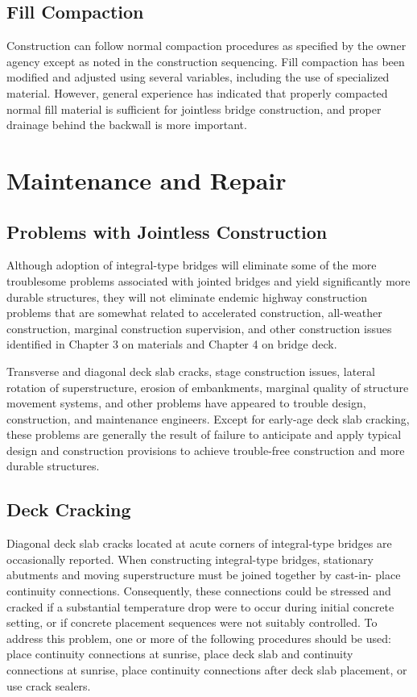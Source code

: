\subsection{Fill Compaction}
Construction can follow normal compaction procedures as specified by the owner agency except as noted in the
construction sequencing. Fill compaction has been modified and adjusted using several variables, including the use of
specialized material. However, general experience has indicated that properly compacted normal fill material is
sufficient for jointless bridge construction, and proper drainage behind the backwall is more important.



\section{Maintenance and Repair}
\subsection{Problems with Jointless Construction}
Although adoption of integral-type bridges will eliminate some of the more troublesome problems associated with
jointed bridges and yield significantly more durable structures, they will not eliminate endemic highway construction
problems that are somewhat related to accelerated construction, all-weather construction, marginal construction
supervision, and other construction issues identified in Chapter 3 on materials and Chapter 4 on bridge deck.

Transverse and diagonal deck slab cracks, stage construction issues, lateral rotation of superstructure, erosion of
embankments, marginal quality of structure movement systems, and other problems have appeared to trouble design,
construction, and maintenance engineers. Except for early-age deck slab cracking, these problems are generally the
result of failure to anticipate and apply typical design and construction provisions to achieve trouble-free construction
and more durable structures.

\subsection{Deck Cracking}
Diagonal deck slab cracks located at acute corners of integral-type bridges are occasionally reported. When
constructing integral-type bridges, stationary abutments and moving superstructure must be joined together by cast-in-
place continuity connections. Consequently, these connections could be stressed and cracked if a substantial
temperature drop were to occur during initial concrete setting, or if concrete placement sequences were not suitably
controlled. To address this problem, one or more of the following procedures should be used: place continuity connections at sunrise, place deck slab and continuity connections at sunrise, place continuity connections after deck
slab placement, or use crack sealers.

